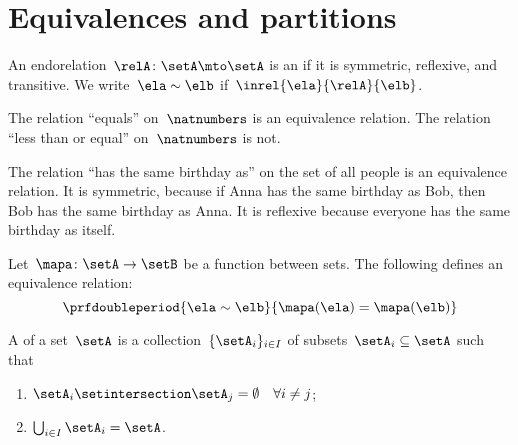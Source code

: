 \section{Equivalences and partitions}
\begin{ctdefinition}
	\label{def:equivalence-relation}
	An endorelation~$\relA\colon \setA\mto \setA$ is an \emph{} if it is symmetric, reflexive, and transitive.
	We write~$\ela\sim \elb$ if~$\inrel{\ela}{\relA}{\elb}$.
\end{ctdefinition}

\begin{example}
	The relation ``equals'' on~$\natnumbers$ is an equivalence relation.
	The relation ``less than or equal'' on~$\natnumbers$ is not.
\end{example}

\begin{example}
	The relation ``has the same birthday as'' on the set of all people is an equivalence relation.
	It is symmetric, because if Anna has the same birthday as Bob, then Bob has the same birthday as Anna.
	It is reflexive because everyone has the same birthday as itself.
\end{example}

\begin{example}
	Let~$\mapa\colon \setA\to \setB$ be a function between sets.
	The following defines an equivalence relation:
	\begin{equation*}
		\prfdoubleperiod{
			\ela\sim \elb
		}{
			\mapa(\ela)=\mapa(\elb)
		}
	\end{equation*}
\end{example}

\begin{ctdefinition}[Partition]
	\label{def:partition}
	A \emph{} of a set~$\setA$ is a collection~$\{\setA_i\}_{i\in I}$ of subsets~$\setA_i\subseteq \setA$ such that
	\begin{enumerate}
		\item $\setA_i\setintersection \setA_j=\emptyset \quad \forall i\neq j$;
		\item $\bigcup_{i\in I}\setA_i=\setA$.
	\end{enumerate}
\end{ctdefinition}

